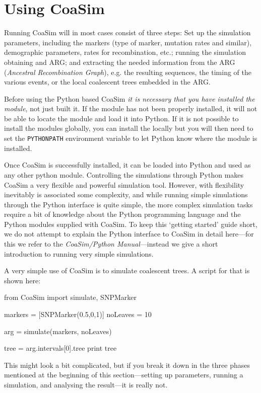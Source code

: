 \documentclass{manual}
\begin{document}
\section{Using CoaSim}

Running CoaSim will in most cases consist of three steps: Set up the
simulation parameters, including the markers (type of marker, mutation
rates and similar), demographic parameters, rates for recombination,
etc.; running the simulation obtaining and ARG; and extracting the
needed information from the ARG (\emph{Ancestral Recombination
  Graph}), e.g. the resulting sequences, the timing of the various
events, or the local coalescent trees embedded in the ARG.

Before using the Python based CoaSim \emph{it is necessary that you
  have installed the module}, not just built it.  If the module has
not been properly installed, it will not be able to locate the module
and load it into Python.  If it is not possible to install the modules
globally, you can install the locally but you will then need to set
the \verb?PYTHONPATH? environment variable to let Python know
where the module is installed.

Once CoaSim is successfully installed, it can be loaded into Python
and used as any other python module.  Controlling the simulations
through Python makes CoaSim a very flexible and powerful simulation
tool. However, with flexibility inevitably is associated some
complexity, and while running simple simulations through the Python
interface is quite simple, the more complex simulation tasks require a
bit of knowledge about the Python programming language and the Python
modules supplied with CoaSim.  To keep this `getting started' guide
short, we do not attempt to explain the Python interface to CoaSim in
detail here---for this we refer to the \emph{CoaSim/Python
  Manual}---instead we give a short introduction to running very
simple simulations.

A very simple use of CoaSim is to simulate coalescent trees.  A script
for that is shown here:
\begin{code}
from CoaSim import simulate, SNPMarker

markers = [SNPMarker(0.5,0,1)]
noLeaves = 10

arg = simulate(markers, noLeaves)

tree = arg.intervals[0].tree
print tree
\end{code}
This might look a bit complicated, but if you break it down in the
three phases mentioned at the beginning of this section---setting up
parameters, running a simulation, and analysing the result---it is
really not.
\end{document}
